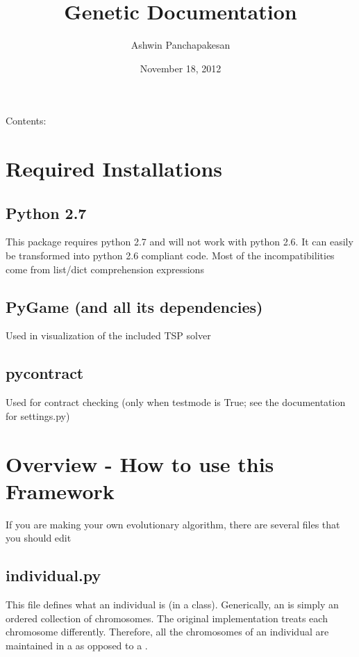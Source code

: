 \documentclass[letterpaper,10pt,english]{sphinxmanual}
\title{Genetic Documentation}
\date{November 18, 2012}
\author{Ashwin Panchapakesan}
\begin{document}
\maketitle
\tableofcontents
{}\label{index::doc}


Contents:


\chapter{Required Installations}
\label{Required Installs:required-installations}\label{Required Installs::doc}\label{Required Installs:welcome-to-genetic-s-documentation}

\section{Python 2.7}
\label{Required Installs:python-2-7}
This package requires python 2.7 and will not work with python 2.6.
It can easily be transformed into python 2.6 compliant code. Most of the incompatibilities come from list/dict comprehension expressions


\section{PyGame (and all its dependencies)}
\label{Required Installs:pygame-and-all-its-dependencies}
Used in visualization of the included TSP solver


\section{pycontract}
\label{Required Installs:pycontract}
Used for contract checking (only when testmode is True; see the documentation for settings.py)


\chapter{Overview - How to use this Framework}
\label{Overview:overview-how-to-use-this-framework}\label{Overview::doc}
If you are making your own evolutionary algorithm, there are several files that you should edit


\section{individual.py}
\label{Overview:individual-py}
This file defines what an individual is (in a class). Generically, an  is simply an ordered collection of chromosomes. The original implementation treats each chromosome differently. Therefore, all the chromosomes of an individual are maintained in a  as opposed to a .
\end{document}
